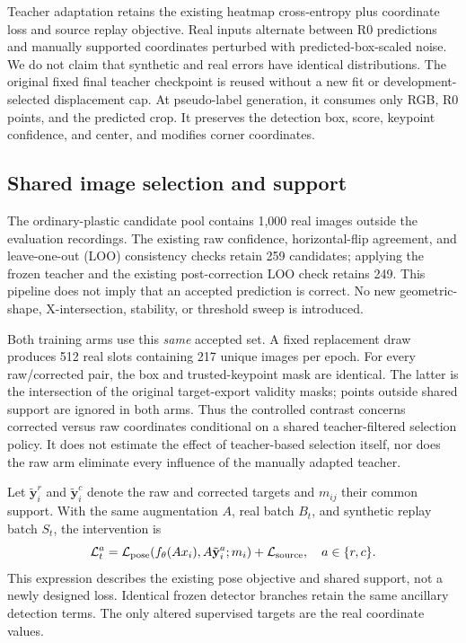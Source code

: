 \documentclass[journal]{IEEEtran}
\begin{document}
Teacher adaptation retains the existing heatmap cross-entropy plus coordinate loss and source replay objective. Real inputs alternate between R0 predictions and manually supported coordinates perturbed with predicted-box-scaled noise. We do not claim that synthetic and real errors have identical distributions. The original fixed final teacher checkpoint is reused without a new fit or development-selected displacement cap. At pseudo-label generation, it consumes only RGB, R0 points, and the predicted crop. It preserves the detection box, score, keypoint confidence, and center, and modifies corner coordinates.

\subsection{Shared image selection and support}
The ordinary-plastic candidate pool contains 1,000 real images outside the evaluation recordings. The existing raw confidence, horizontal-flip agreement, and leave-one-out (LOO) consistency checks retain 259 candidates; applying the frozen teacher and the existing post-correction LOO check retains 249. This pipeline does not imply that an accepted prediction is correct. No new geometric-shape, X-intersection, stability, or threshold sweep is introduced.

Both training arms use this \emph{same} accepted set. A fixed replacement draw produces 512 real slots containing 217 unique images per epoch. For every raw/corrected pair, the box and trusted-keypoint mask are identical. The latter is the intersection of the original target-export validity masks; points outside shared support are ignored in both arms. Thus the controlled contrast concerns corrected versus raw coordinates conditional on a shared teacher-filtered selection policy. It does not estimate the effect of teacher-based selection itself, nor does the raw arm eliminate every influence of the manually adapted teacher.

Let $\tilde{\mathbf y}^{r}_i$ and $\tilde{\mathbf y}^{c}_i$ denote the raw and corrected targets and $m_{ij}$ their common support. With the same augmentation $A$, real batch $B_t$, and synthetic replay batch $S_t$, the intervention is
\begin{equation}
\mathcal L_t^{a}=\mathcal L_{\rm pose}(f_\theta(Ax_i),A\tilde{\mathbf y}^{a}_i;m_i)
+\mathcal L_{\rm source},\quad a\in\{r,c\}.
\end{equation}
This expression describes the existing pose objective and shared support, not a newly designed loss. Identical frozen detector branches retain the same ancillary detection terms. The only altered supervised targets are the real coordinate values.
\end{document}
